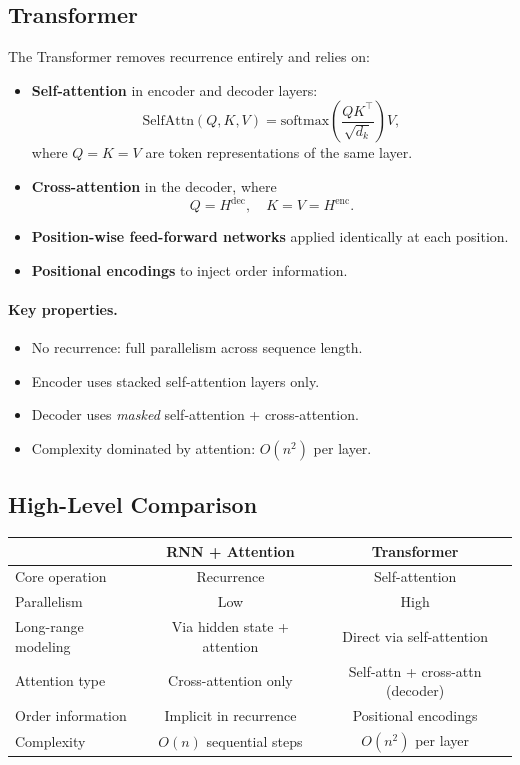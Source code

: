 \documentclass[12pt]{article}
\begin{document}
\subsection{Transformer}
The Transformer removes recurrence entirely and relies on:
\begin{itemize}
		\item \textbf{Self-attention} in encoder and decoder layers:
    \[
						\mathrm{SelfAttn}(Q,K,V)
						= \mathrm{softmax}\!\left(\frac{QK^\top}{\sqrt{d_k}}\right)V,
    \]
    where $Q=K=V$ are token representations of the same layer.
		\item \textbf{Cross-attention} in the decoder, where
    \[
						Q = H^{\text{dec}}, \quad K=V = H^{\text{enc}}.
    \]
		\item \textbf{Position-wise feed-forward networks} applied identically at each position.
		\item \textbf{Positional encodings} to inject order information.
\end{itemize}

\paragraph{Key properties.}
\begin{itemize}
		\item No recurrence: full parallelism across sequence length.
		\item Encoder uses stacked self-attention layers only.
		\item Decoder uses \emph{masked} self-attention + cross-attention.
		\item Complexity dominated by attention: $O(n^2)$ per layer.
\end{itemize}

\subsection{High-Level Comparison}
\begin{center}
		\begin{tabular}{lcc}
				\toprule
				& \textbf{RNN + Attention} & \textbf{Transformer} \\
				\midrule
				Core operation & Recurrence & Self-attention \\
				Parallelism & Low & High \\
				Long-range modeling & Via hidden state + attention & Direct via self-attention \\
				Attention type & Cross-attention only & Self-attn + cross-attn (decoder) \\
				Order information & Implicit in recurrence & Positional encodings \\
				Complexity & $O(n)$ sequential steps & $O(n^2)$ per layer \\
				\bottomrule
		\end{tabular}
\end{center}
\end{document}
